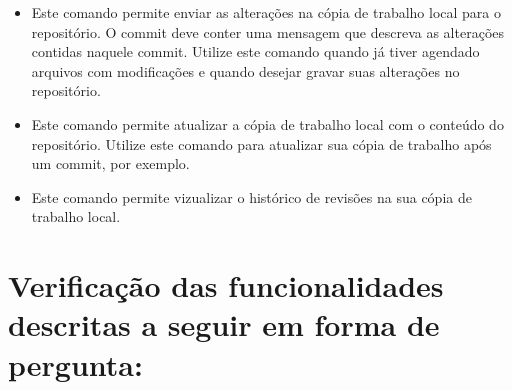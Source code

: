 \begin{itemize}
\item \colorbox{PineGreen}{
	\begin{minipage}{.57\linewidth}
	\end{minipage}
	}
    
    \subitem Este comando permite enviar as alterações na cópia de trabalho local para o repositório.
	     O commit deve conter uma mensagem que descreva as alterações contidas naquele commit.
	     Utilize este comando quando já tiver agendado arquivos com modificações e quando desejar
	     gravar suas alterações no repositório.

\item \colorbox{PineGreen}{
	\begin{minipage}{.18\linewidth}
	\end{minipage}
	}
    
    \subitem Este comando permite atualizar a cópia de trabalho local com o conteúdo do repositório.
	     Utilize este comando para atualizar sua cópia de trabalho após um commit, por exemplo.
    
\item \colorbox{PineGreen}{
	\begin{minipage}{.13\linewidth}
	\end{minipage}
	}
	
    \subitem Este comando permite vizualizar o histórico de revisões na sua cópia de trabalho local.
    
\end{itemize}

% 
% 
% 
% 
% 
% 
% 

\section{Verificação das funcionalidades descritas a seguir em forma de pergunta:}

